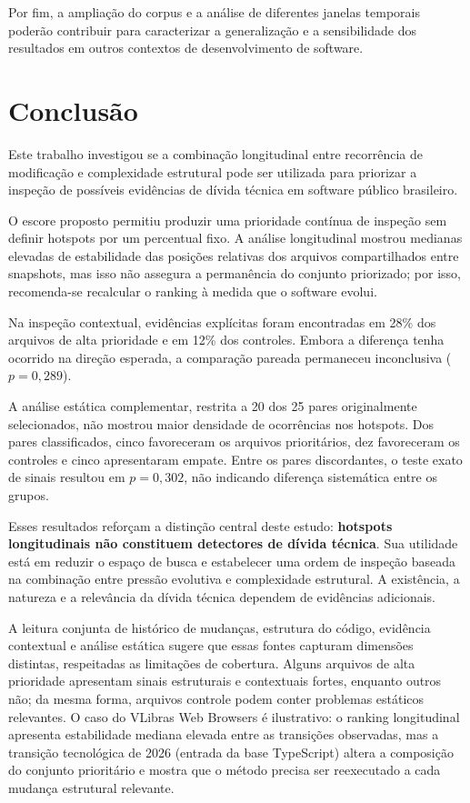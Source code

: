 \documentclass[12pt]{article}
\begin{document}
Por fim, a ampliação do corpus e a análise de diferentes janelas temporais poderão contribuir para caracterizar a generalização e a sensibilidade dos resultados em outros contextos de desenvolvimento de software.

\section{Conclusão}
Este trabalho investigou se a combinação longitudinal entre recorrência de modificação e complexidade estrutural pode ser utilizada para priorizar a inspeção de possíveis evidências de dívida técnica em software público brasileiro.

O escore proposto permitiu produzir uma prioridade contínua de inspeção sem definir hotspots por um percentual fixo. A análise longitudinal mostrou medianas elevadas de estabilidade das posições relativas dos arquivos compartilhados entre snapshots, mas isso não assegura a permanência do conjunto priorizado; por isso, recomenda-se recalcular o ranking à medida que o software evolui.

Na inspeção contextual, evidências explícitas foram encontradas em 28\% dos arquivos de alta prioridade e em 12\% dos controles. Embora a diferença tenha ocorrido na direção esperada, a comparação pareada permaneceu inconclusiva ($p=0{,}289$).

A análise estática complementar, restrita a 20 dos 25 pares originalmente selecionados, não mostrou maior densidade de ocorrências nos hotspots. Dos pares classificados, cinco favoreceram os arquivos prioritários, dez favoreceram os controles e cinco apresentaram empate. Entre os pares discordantes, o teste exato de sinais resultou em $p=0{,}302$, não indicando diferença sistemática entre os grupos.

Esses resultados reforçam a distinção central deste estudo: \textbf{hotspots longitudinais não constituem detectores de dívida técnica}. Sua utilidade está em reduzir o espaço de busca e estabelecer uma ordem de inspeção baseada na combinação entre pressão evolutiva e complexidade estrutural. A existência, a natureza e a relevância da dívida técnica dependem de evidências adicionais.

A leitura conjunta de histórico de mudanças, estrutura do código, evidência contextual e análise estática sugere que essas fontes capturam dimensões distintas, respeitadas as limitações de cobertura. Alguns arquivos de alta prioridade apresentam sinais estruturais e contextuais fortes, enquanto outros não; da mesma forma, arquivos controle podem conter problemas estáticos relevantes. O caso do VLibras Web Browsers é ilustrativo: o ranking longitudinal apresenta estabilidade mediana elevada entre as transições observadas, mas a transição tecnológica de 2026 (entrada da base TypeScript) altera a composição do conjunto prioritário e mostra que o método precisa ser reexecutado a cada mudança estrutural relevante.
\end{document}

